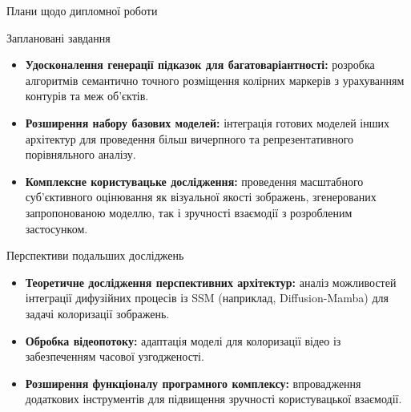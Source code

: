 \begin{frame}{Плани щодо дипломної роботи}
    \begin{block}{Заплановані завдання}
        \begin{itemize}
            \item \textbf{Удосконалення генерації підказок для багатоваріантності:} 
                розробка алгоритмів семантично точного розміщення колірних маркерів з урахуванням контурів та меж об'єктів.
            \item \textbf{Розширення набору базових моделей:} 
                інтеграція готових моделей інших архітектур для проведення більш вичерпного та репрезентативного порівняльного аналізу.
            \item \textbf{Комплексне користувацьке дослідження:} 
                проведення масштабного суб'єктивного оцінювання як візуальної якості зображень, згенерованих запропонованою моделлю, так і зручності взаємодії з розробленим застосунком.
        \end{itemize}
    \end{block}
\end{frame}

\begin{frame}{Перспективи подальших досліджень}
    \begin{itemize}
        \item \textbf{Теоретичне дослідження перспективних архітектур:}
            аналіз можливостей інтеграції дифузійних процесів із SSM (наприклад, Diffusion-Mamba) для задачі колоризації зображень.
        \item \textbf{Обробка відеопотоку:}
            адаптація моделі для колоризації відео із забезпеченням часової узгодженості.
        \item \textbf{Розширення функціоналу програмного комплексу:}
            впровадження додаткових інструментів для підвищення зручності користувацької взаємодії.
    \end{itemize}
\end{frame}